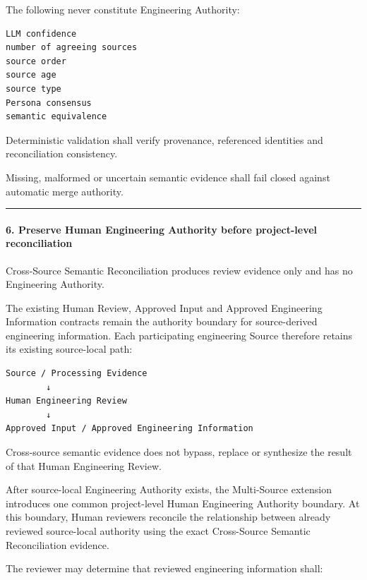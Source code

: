 The following never constitute Engineering Authority:

\begin{verbatim}
LLM confidence
number of agreeing sources
source order
source age
source type
Persona consensus
semantic equivalence
\end{verbatim}

Deterministic validation shall verify provenance, referenced identities and reconciliation consistency.

Missing, malformed or uncertain semantic evidence shall fail closed against automatic merge authority.

\begin{center}\rule{0.5\linewidth}{0.5pt}\end{center}

\hypertarget{6-preserve-human-engineering-authority-before-project-level-reconciliation}{%
\paragraph{6. Preserve Human Engineering Authority before project-level reconciliation}\label{6-preserve-human-engineering-authority-before-project-level-reconciliation}}

Cross-Source Semantic Reconciliation produces review evidence only and has no Engineering Authority.

The existing Human Review, Approved Input and Approved Engineering Information contracts remain the authority boundary for source-derived engineering information. Each participating engineering Source therefore retains its existing source-local path:

\begin{verbatim}
Source / Processing Evidence
        ↓
Human Engineering Review
        ↓
Approved Input / Approved Engineering Information
\end{verbatim}

Cross-source semantic evidence does not bypass, replace or synthesize the result of that Human Engineering Review.

After source-local Engineering Authority exists, the Multi-Source extension introduces one common project-level Human Engineering Authority boundary. At this boundary, Human reviewers reconcile the relationship between already reviewed source-local authority using the exact Cross-Source Semantic Reconciliation evidence.

The reviewer may determine that reviewed engineering information shall:

